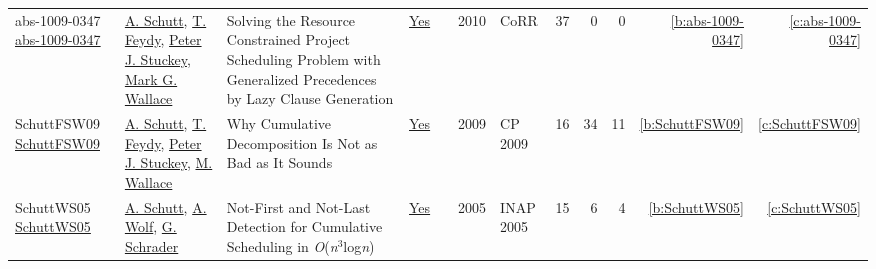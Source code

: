{\begin{longtable}{>{\raggedright\arraybackslash}p{3cm}>{\raggedright\arraybackslash}p{6cm}>{\raggedright\arraybackslash}p{6.5cm}rrrp{2.5cm}rrrrr}
abs-1009-0347 \href{http://arxiv.org/abs/1009.0347}{abs-1009-0347} & \hyperref[auth:a125]{A. Schutt}, \hyperref[auth:a155]{T. Feydy}, \hyperref[auth:a126]{Peter J. Stuckey}, \hyperref[auth:a156]{Mark G. Wallace} & Solving the Resource Constrained Project Scheduling Problem with Generalized Precedences by Lazy Clause Generation & \href{works/abs-1009-0347.pdf}{Yes} & \cite{abs-1009-0347} & 2010 & CoRR & 37 & 0 & 0 & \ref{b:abs-1009-0347} & \ref{c:abs-1009-0347}\\
SchuttFSW09 \href{https://doi.org/10.1007/978-3-642-04244-7\_58}{SchuttFSW09} & \hyperref[auth:a125]{A. Schutt}, \hyperref[auth:a155]{T. Feydy}, \hyperref[auth:a126]{Peter J. Stuckey}, \hyperref[auth:a117]{M. Wallace} & Why Cumulative Decomposition Is Not as Bad as It Sounds & \href{works/SchuttFSW09.pdf}{Yes} & \cite{SchuttFSW09} & 2009 & CP 2009 & 16 & 34 & 11 & \ref{b:SchuttFSW09} & \ref{c:SchuttFSW09}\\
SchuttWS05 \href{https://doi.org/10.1007/11963578\_6}{SchuttWS05} & \hyperref[auth:a125]{A. Schutt}, \hyperref[auth:a51]{A. Wolf}, \hyperref[auth:a720]{G. Schrader} & Not-First and Not-Last Detection for Cumulative Scheduling in \emph{O}(\emph{n}\({}^{\mbox{3}}\)log\emph{n}) & \href{works/SchuttWS05.pdf}{Yes} & \cite{SchuttWS05} & 2005 & INAP 2005 & 15 & 6 & 4 & \ref{b:SchuttWS05} & \ref{c:SchuttWS05}\\
\end{longtable}
}

